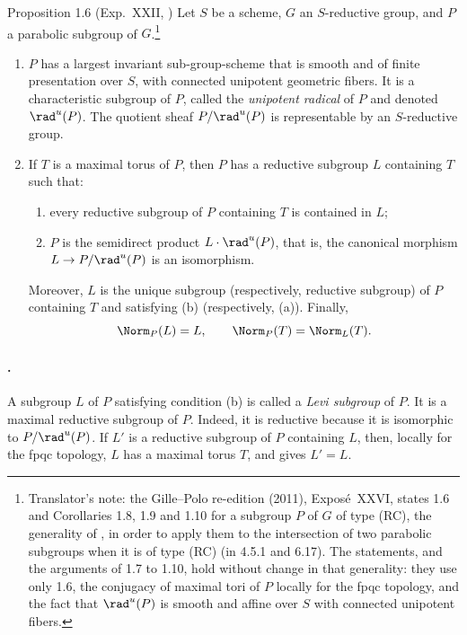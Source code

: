 \begin{sgastatement}{Proposition 1.6 \textup{(Exp.\ XXII, )}}
Let \(S\) be a scheme, \(G\) an \(S\)-reductive group, and \(P\) a parabolic
subgroup of \(G\).\footnote{Translator's note: the Gille--Polo re-edition (2011), Exposé~XXVI, states
1.6 and Corollaries 1.8, 1.9 and 1.10 for a subgroup \(P\) of \(G\) of type
(RC), the generality of , in order to apply them to
the intersection of two parabolic subgroups when it is of type (RC) (in 4.5.1
and 6.17). The statements, and the arguments of 1.7 to 1.10, hold without
change in that generality: they use only 1.6, the conjugacy of maximal tori
of \(P\) locally for the fpqc topology, and the fact that \(\rad^u(P)\) is
smooth and affine over \(S\) with connected unipotent fibers.}
\begin{enumerate}[label=\textup{(\roman*)}]
\item \(P\) has a largest invariant sub-group-scheme that is smooth and of
finite presentation over \(S\), with connected unipotent geometric fibers.
It is a characteristic subgroup of \(P\), called the \emph{unipotent
radical} of \(P\) and denoted \(\rad^u(P)\).  The quotient sheaf
\(P/\rad^u(P)\) is representable by an \(S\)-reductive group.
\item{} If \(T\) is a maximal torus of \(P\), then \(P\) has a reductive
subgroup \(L\) containing \(T\) such that:
\begin{enumerate}[label=\textup{(\alph*)}]
\item every reductive subgroup of \(P\) containing \(T\) is contained in
\(L\);
\item \(P\) is the semidirect product \(L\cdot\rad^u(P)\), that is, the
canonical morphism \(L\to P/\rad^u(P)\) is an isomorphism.
\end{enumerate}
Moreover, \(L\) is the unique subgroup \textup{(respectively, reductive
subgroup)} of \(P\) containing \(T\) and satisfying (b) \textup{(respectively,
(a))}.  Finally,
\[
 \Norm_P(L)=L,\qquad \Norm_P(T)=\Norm_L(T).
\]
\end{enumerate}
\end{sgastatement}

\paragraph{.}
A subgroup \(L\) of \(P\) satisfying condition (b) is called a
\emph{Levi subgroup} of \(P\).  It is a maximal reductive subgroup of
\(P\).  Indeed, it is reductive because it is isomorphic to
\(P/\rad^u(P)\).  If \(L'\) is a reductive subgroup of \(P\) containing
\(L\), then, locally for the fpqc topology, \(L\) has a maximal torus
\(T\), and  gives \(L'=L\).

